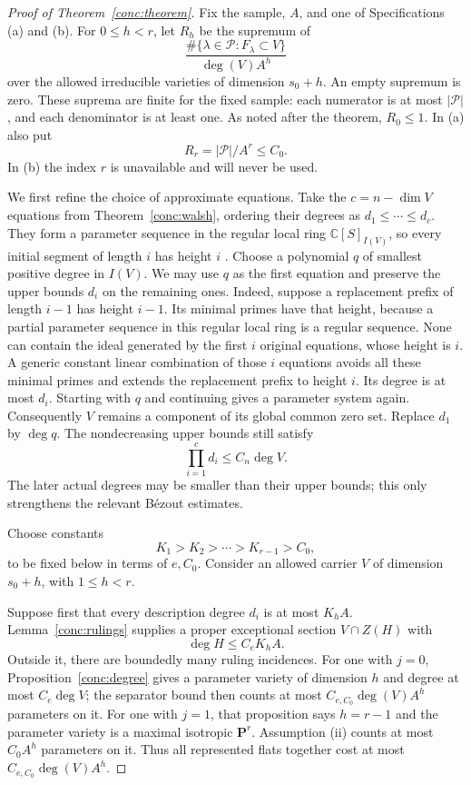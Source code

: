 \begin{proof}[Proof of Theorem~\ref{conc:theorem}]
Fix the sample, $A$, and one of Specifications (a) and (b).  For
$0\leq h<r$, let $R_h$ be the supremum of
\[
 \frac{\#\{\lambda\in\mathcal P:F_\lambda\subset V\}}
      {\deg(V)A^h}
\]
over the allowed irreducible varieties of dimension $s_0+h$.
An empty supremum is zero.  These suprema are finite for the fixed
sample: each numerator is at most $|\mathcal P|$, and each denominator
is at least one.  As noted after the theorem, $R_0\leq1$.  In (a) also
put
\[
 R_r=|\mathcal P|/A^r\leq C_0.
\]
In (b) the index $r$ is unavailable and will never be used.

We first refine the choice of approximate equations.  Take the
$c=n-\dim V$ equations from Theorem~\ref{conc:walsh}, ordering their
degrees as $d_1\leq\cdots\leq d_c$.  They form a parameter sequence
in the regular local ring $\mathbb C[S]_{I(V)}$, so every initial
segment of length $i$ has height $i$
\mbox{\cite[Tags~00NQ, 02JN, and 00NA]{stacksproject}}.  Choose a polynomial $q$ of
smallest positive degree in $I(V)$.  We may use $q$ as the first
equation and preserve the upper bounds $d_i$ on the remaining ones.
Indeed, suppose a replacement prefix of length $i-1$ has height
$i-1$.  Its minimal primes have that height, because a partial
parameter sequence in this regular local ring is a regular sequence.
None can contain the ideal generated by the first $i$ original
equations, whose height is $i$.  A generic constant linear combination
of those $i$ equations avoids all these minimal primes and extends
the replacement prefix to height $i$.  Its degree is at most $d_i$.
Starting with $q$ and continuing gives a parameter system again.
Consequently $V$ remains a component of its global common zero set.
Replace $d_1$ by $\deg q$.  The nondecreasing upper bounds still satisfy
\begin{equation}
 \prod_{i=1}^c d_i\leq C_n\deg V.
 \label{conc:description-product}
\end{equation}
The later actual degrees may be smaller than their upper bounds;
this only strengthens the relevant B\'ezout estimates.

Choose constants
\[
 K_1>K_2>\cdots>K_{r-1}>C_0,
\]
to be fixed below in terms of $e,C_0$.  Consider an allowed carrier
$V$ of dimension $s_0+h$, with $1\leq h<r$.

Suppose first that every description degree $d_i$ is at most $K_hA$.
Lemma~\ref{conc:rulings} supplies a proper exceptional section
$V\cap Z(H)$ with
\[
 \deg H\leq C_eK_hA.
\]
Outside it, there are boundedly many ruling incidences.  For one with
$j=0$, Proposition~\ref{conc:degree} gives a parameter variety of
dimension $h$ and degree at most $C_e\deg V$; the separator bound
then counts at most $C_{e,C_0}\deg(V)A^h$ parameters on it.  For one
with $j=1$, that proposition says $h=r-1$ and the parameter variety is
a maximal isotropic $\mathbf P^r$.  Assumption (ii) counts at most
$C_0A^h$ parameters on it.  Thus all represented flats together cost
at most $C_{e,C_0}\deg(V)A^h$.


\end{proof}

